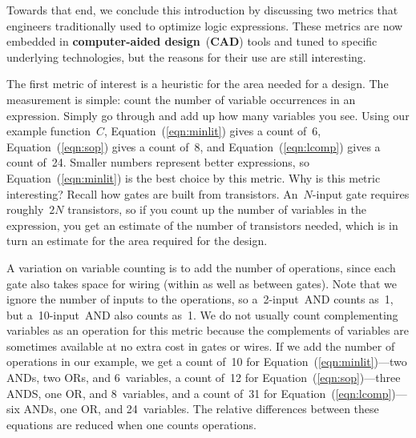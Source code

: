 Towards that end, we conclude this introduction by discussing two
metrics that engineers traditionally used to optimize 
logic expressions.  These metrics are now embedded in {\bf computer-aided 
design}~({\bf CAD}) tools and tuned to specific underlying technologies,
but the reasons for their use are still interesting.

The first metric of interest is a heuristic for the area needed for
a design.
%
The measurement is simple: count the number of variable occurrences in
an expression.  Simply go through and add up how many variables you see.
Using our example function~$C$, 
Equation~(\ref{eqn:minlit}) gives a count of~6,
Equation~(\ref{eqn:sop}) gives a count of~8, and
Equation~(\ref{eqn:lcomp}) gives a count of~24.
Smaller numbers represent better expressions, so 
Equation~(\ref{eqn:minlit}) is the best choice by this metric.
%
Why is this metric interesting?
Recall how gates are built from transistors.
An~\mbox{$N$-input} gate requires roughly~$2N$ transistors, so if you 
count up the number of variables in the
expression, you get an estimate of the number of transistors needed,
which is in turn an estimate for the area required for the design.

A variation on variable counting is to add the number of operations,
since each gate also takes space for wiring (within as well as between
gates).  Note that we ignore the number of inputs to the operations,
so a~\mbox{2-input}~AND counts as~1, but a~\mbox{10-input}~AND also counts
as~1.  We do not usually count complementing variables as an operation
for this metric because the complements of variables are sometimes 
available at no extra cost in gates or wires.
%
If we add the number of operations in our example, we get
a count of~10 for Equation~(\ref{eqn:minlit})---two ANDs, two ORs,
and 6~variables,
%
a count of~12 for Equation~(\ref{eqn:sop})---three ANDS, one OR,
and 8~variables,
%
and a count of~31 for Equation~(\ref{eqn:lcomp})---six ANDs, one OR,
and 24~variables.
%
The relative differences between these equations 
are reduced when one counts operations.

